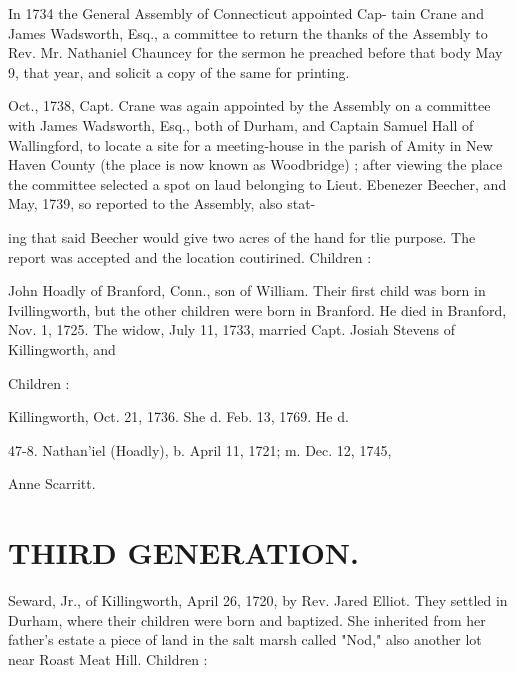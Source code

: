 \documentclass{book}
\begin{document}
In 1734 the General Assembly of Connecticut appointed Cap- 
tain Crane and James Wadsworth, Esq., a committee to return 
the thanks of the Assembly to Rev. Mr. Nathaniel Chauncey for 
the sermon he preached before that body May 9, that year, and 
solicit a copy of the same for printing. 

Oct., 1738, Capt. Crane was again appointed by the Assembly 
on a committee with James Wadsworth, Esq., both of Durham, 
and Captain Samuel Hall of Wallingford, to locate a site for a 
meeting-house in the parish of Amity in New Haven County (the 
place is now known as Woodbridge) ; after viewing the place the 
committee selected a spot on laud belonging to Lieut. Ebenezer 
Beecher, and May, 1739, so reported to the Assembly, also stat- 




ing that said Beecher would give two acres of the hand for tlie 
purpose. The report was accepted and the location coutirined. 
Children : 





John Hoadly of Branford, Conn., son of William. Their first 
child was born in Ivillingworth, but the other children were born 
in Branford. He died in Branford, Nov. 1, 1725. The widow, 
July 11, 1733, married Capt. Josiah Stevens of Killingworth, and 

Children : 







Killingworth, Oct. 21, 1736. She d. Feb. 13, 1769. He d. 


47-8. Nathan'iel (Hoadly), b. April 11, 1721; m. Dec. 12, 1745, 

Anne Scarritt. 



\section{THIRD GENERATION.}


Seward, Jr., of Killingworth, April 26, 1720, by Rev. Jared 
Elliot. They settled in Durham, where their children were born 
and baptized. She inherited from her father's estate a piece of 
land in the salt marsh called "Nod," also another lot near Roast 
Meat Hill. Children : 
\end{document}
